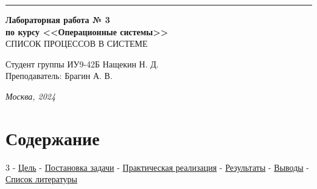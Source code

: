 \documentclass[a4paper, 14pt]{extarticle}
\begin{document}
\begin{titlepage}
\vspace*{-16pt}
\hspace{30pt}\rule{0.866\textwidth}{0.4pt}
  
\vspace{11em}

\begin{center}
\Large {\bf Лабораторная работа № 3} \\ 
\large {\bf по курсу <<Операционные системы>>} \\ 
{СПИСОК ПРОЦЕССОВ В СИСТЕМЕ} \\
\end{center}\normalsize

\vspace{8em}


\begin{flushright}
  {Студент группы ИУ9-42Б Нащекин Н. Д.\hspace*{15pt} \\
  \vspace{2ex}
  Преподаватель: Брагин А. В.\hspace*{15pt}}
\end{flushright}

\bigskip

\vfill
 

\begin{center}
\textsl{Москва, 2024}
\end{center}
\end{titlepage}

\renewcommand{\ttdefault}{pcr}

\setlength{\tabcolsep}{3pt}
\newpage
\setcounter{page}{2}

\section{Содержание}
\begin{flushleft}
3 - \hyperref[sec:Goal]{Цель} - \hyperref[sec:ToDo]{Постановка задачи} - \hyperref[sec:Realization]{Практическая реализация} - \hyperref[sec:Results]{Результаты} - \hyperref[sec:Conclusion]{Выводы} - \hyperref[sec:Literature]{Список литературы}\newline
\end{flushleft}
\pagebreak
\end{document}
